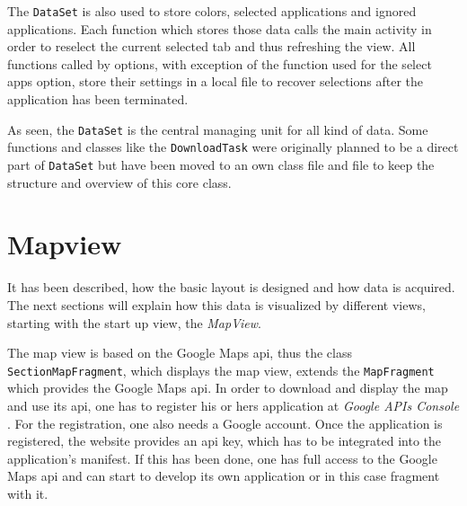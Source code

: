 The \lstinline$DataSet$ is also used to store colors, selected applications and ignored applications. Each function which stores those data calls the main activity in order to reselect the current selected tab and thus refreshing the view. All functions called by options, with exception of the function used for the select apps option, store their settings in a local file to recover selections after the application has been terminated.

As seen, the \lstinline$DataSet$ is the central managing unit for all kind of data. Some functions and classes like the \lstinline$DownloadTask$ were originally planned to be a direct part of \lstinline$DataSet$ but have been moved to an own class file and file to keep the structure and overview of this core class.
\newpage
\section{Mapview}
It has been described, how the basic layout is designed and how data is acquired. The next sections will explain how this data is visualized by different views, starting with the start up view, the \emph{MapView}.

The  map view is based on the Google Maps api, thus the class \lstinline$SectionMapFragment$, which displays the map view, extends the \lstinline$MapFragment$ which provides the Google Maps api. In order to download and display the map and use its api, one has to register his or hers application at \emph{Google APIs Console} \cite{googleapi}. For the registration, one also needs a Google account. Once the application is registered, the website provides an api key, which has to be integrated into the application's manifest. If this has been done, one has full access to the Google Maps api and can start to develop its own application or in this case fragment with it.

